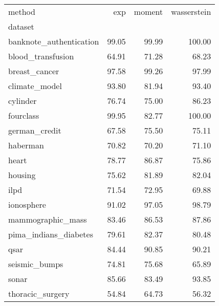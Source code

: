 \documentclass{article}
\begin{document}
 
\begin{tabular}{lrrr}
\toprule
method &    exp &  moment &  wasserstein \\
dataset                 &        &         &              \\
\midrule
banknote\_authentication &  99.05 &   99.99 &       100.00 \\
blood\_transfusion       &  64.91 &   71.28 &        68.23 \\
breast\_cancer           &  97.58 &   99.26 &        97.99 \\
climate\_model           &  93.80 &   81.94 &        93.40 \\
cylinder                &  76.74 &   75.00 &        86.23 \\
fourclass               &  99.95 &   82.77 &       100.00 \\
german\_credit           &  67.58 &   75.50 &        75.11 \\
haberman                &  70.82 &   70.20 &        71.10 \\
heart                   &  78.77 &   86.87 &        75.86 \\
housing                 &  75.62 &   81.89 &        82.04 \\
ilpd                    &  71.54 &   72.95 &        69.88 \\
ionosphere              &  91.02 &   97.05 &        98.79 \\
mammographic\_mass       &  83.46 &   86.53 &        87.86 \\
pima\_indians\_diabetes   &  79.61 &   82.37 &        80.48 \\
qsar                    &  84.44 &   90.85 &        90.21 \\
seismic\_bumps           &  74.81 &   75.68 &        65.89 \\
sonar                   &  85.66 &   83.49 &        93.85 \\
thoracic\_surgery        &  54.84 &   64.73 &        56.32 \\
\bottomrule
\end{tabular}

 
\end{document}

